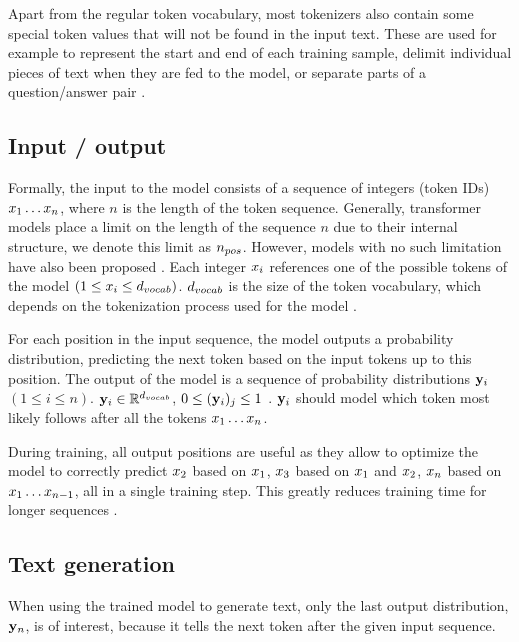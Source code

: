 Apart from the regular token vocabulary, most tokenizers also contain some special token values that will not be found in the input text. These are used for example to represent the start and end of each training sample, delimit individual pieces of text when they are fed to the model, or separate parts of a question/answer pair \cite{HuggingFaceTokenizers}.


\subsection{Input / output}
\label{transformer:input}

Formally, the input to the model consists of a sequence of integers (token IDs) ${x}_1 \ldots {x}_n$, where $n$ is the length of the token sequence.
Generally, transformer models place a limit on the length of the sequence $n$ due to their internal structure, we denote this limit as ${n_{pos}}$. However, models with no such limitation have also been proposed \cite{su2023roformer}.
Each integer ${x}_i$ references one of the possible tokens of the model $(1 \leq {x}_i \leq {d_{vocab}})$. ${d_{vocab}}$ is the size of the token vocabulary, which depends on the tokenization process used for the model .

\label{transformer:output}

For each position in the input sequence, the model outputs a probability distribution, predicting the next token based on the input tokens up to this position. 
The output of the model is a sequence of probability distributions ${\mathbf{y}}_i$ $(1 \leq i \leq n)$. ${\mathbf{y}}_i \in \mathbb{R}^{d_{vocab}}$, $0 \leq ({\mathbf{y}}_i)_j \leq 1$  \cite{HuggingFaceGPT2}.
${\mathbf{y}}_i$ should model which token most likely follows after all the tokens ${x}_1 \ldots {x}_n$.

During training, all output positions are useful as they allow to optimize the model to correctly predict ${x}_2$ based on ${x}_1$,
${x}_3$ based on ${x}_1$ and ${x}_2$, ${x}_n$ based on ${x}_1 \ldots {x}_{n-1}$, all in a single training step. This greatly reduces training time for longer sequences \cite{alammar-gpt2}.

\subsection{Text generation}

When using the trained model to generate text, only the last output distribution, ${\mathbf{y}}_n$, is of interest, because
it tells the next token after the given input sequence. \cite{Mao2021Autoregressive}

